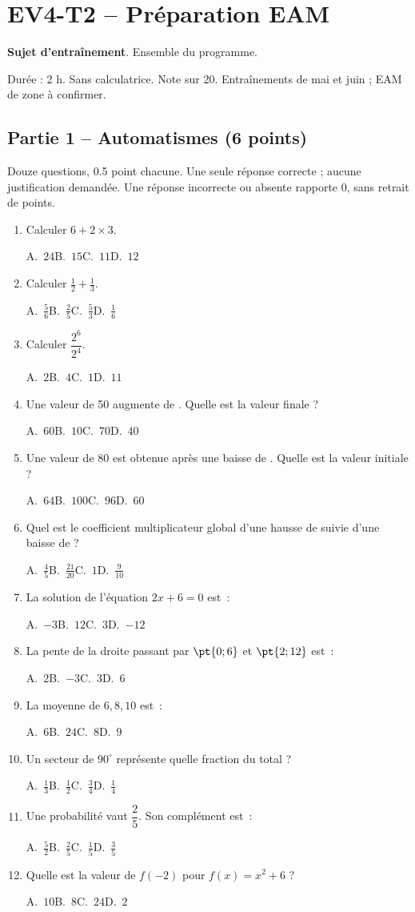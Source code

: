 \mxnewpage\section*{EV4-T2 -- Préparation EAM}\label{EV4-T2}
\textbf{Sujet d’entraînement}. Ensemble du programme.\par Durée : 2 h. Sans calculatrice. Note sur 20. Entraînements de mai et juin ; EAM de zone à confirmer.
\subsection*{Partie 1 -- Automatismes (6 points)}
Douze questions, \num{0,5} point chacune. Une seule réponse correcte ; aucune justification demandée. Une réponse incorrecte ou absente rapporte 0, sans retrait de points.
\begin{enumerate}
\item Calculer $6+2\times3$.\par A.~$24$\quad B.~$15$\quad C.~$11$\quad D.~$12$
\item Calculer $\frac12+\frac13$.\par A.~$\frac{5}{6}$\quad B.~$\frac{2}{5}$\quad C.~$\frac{5}{3}$\quad D.~$\frac{1}{6}$
\item Calculer $\dfrac{2^6}{2^{4}}$.\par A.~$2$\quad B.~$4$\quad C.~$1$\quad D.~$11$
\item Une valeur de 50 augmente de . Quelle est la valeur finale ?\par A.~$60$\quad B.~$10$\quad C.~$70$\quad D.~$40$
\item Une valeur de 80 est obtenue après une baisse de . Quelle est la valeur initiale ?\par A.~$64$\quad B.~$100$\quad C.~$96$\quad D.~$60$
\item Quel est le coefficient multiplicateur global d’une hausse de  suivie d’une baisse de  ?\par A.~$\frac{4}{5}$\quad B.~$\frac{21}{20}$\quad C.~$1$\quad D.~$\frac{9}{10}$
\item La solution de l’équation $2x+6=0$ est~:\par A.~$-3$\quad B.~$12$\quad C.~$3$\quad D.~$-12$
\item La pente de la droite passant par $\pt{0;6}$ et $\pt{2;12}$ est~:\par A.~$2$\quad B.~$-3$\quad C.~$3$\quad D.~$6$
\item La moyenne de $6, 8, 10$ est~:\par A.~$6$\quad B.~$24$\quad C.~$8$\quad D.~$9$
\item Un secteur de $90^\circ$ représente quelle fraction du total ?\par A.~$\frac{1}{3}$\quad B.~$\frac{1}{2}$\quad C.~$\frac{3}{4}$\quad D.~$\frac{1}{4}$
\item Une probabilité vaut $\dfrac{2}{5}$. Son complément est~:\par A.~$\frac{5}{2}$\quad B.~$\frac{2}{5}$\quad C.~$\frac{1}{5}$\quad D.~$\frac{3}{5}$
\item Quelle est la valeur de $f(-2)$ pour $f(x)=x^2+6$ ?\par A.~$10$\quad B.~$8$\quad C.~$24$\quad D.~$2$
\end{enumerate}
